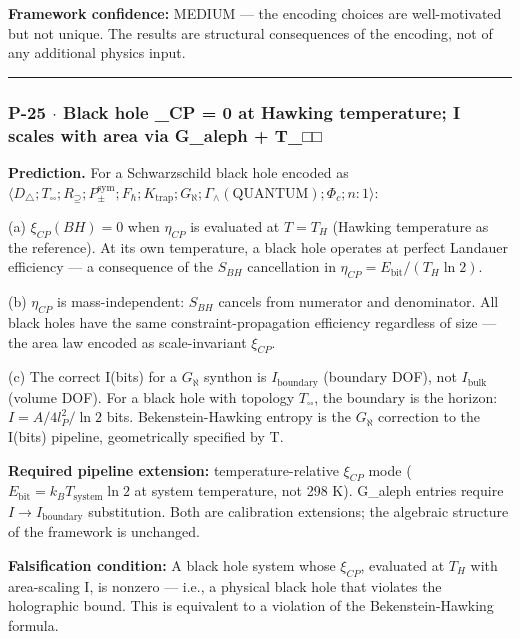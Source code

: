 \documentclass[12pt,a4paper]{article}
\begin{document}
\textbf{Framework confidence:} MEDIUM --- the encoding choices are well-motivated but not unique. The results are structural consequences of the encoding, not of any additional physics input.

\begin{center}
\rule{0.5\textwidth}{0.4pt}
\end{center}

\subsubsection{P-25 $\cdot$ Black hole \xi\_CP = 0 at Hawking temperature; I scales with area via G\_aleph + T\_□□}

\textbf{Prediction.} For a Schwarzschild black hole encoded as $\langle D_{\triangle}; T_{\square\square}; R_{\supseteq}; P_{\pm}^{\text{sym}}; F_{\hbar}; K_{\text{trap}}; G_{\aleph}; \Gamma_{\wedge}(\text{QUANTUM}); \Phi_c; n{:}1 \rangle$:

(a) $\xi_{CP}(BH) = 0$ when $\eta_{CP}$ is evaluated at $T = T_H$ (Hawking temperature as the reference). At its own temperature, a black hole operates at perfect Landauer efficiency --- a consequence of the $S_{BH}$ cancellation in $\eta_{CP} = E_{\text{bit}}/(T_H \ln 2)$.

(b) $\eta_{CP}$ is mass-independent: $S_{BH}$ cancels from numerator and denominator. All black holes have the same constraint-propagation efficiency regardless of size --- the area law encoded as scale-invariant $\xi_{CP}$.

(c) The correct I(bits) for a $G_{\aleph}$ synthon is $I_{\text{boundary}}$ (boundary DOF), not $I_{\text{bulk}}$ (volume DOF). For a black hole with topology $T_{\square\square}$, the boundary is the horizon: $I = A/4l_P^2 / \ln 2$ bits. Bekenstein-Hawking entropy is the $G_{\aleph}$ correction to the I(bits) pipeline, geometrically specified by T.

\textbf{Required pipeline extension:} temperature-relative $\xi_{CP}$ mode ($E_{\text{bit}} = k_B T_{\text{system}} \ln 2$ at system temperature, not 298 K). G\_aleph entries require $I \to I_{\text{boundary}}$ substitution. Both are calibration extensions; the algebraic structure of the framework is unchanged.

\textbf{Falsification condition:} A black hole system whose $\xi_{CP}$, evaluated at $T_H$ with area-scaling I, is nonzero --- i.e., a physical black hole that violates the holographic bound. This is equivalent to a violation of the Bekenstein-Hawking formula.
\end{document}
